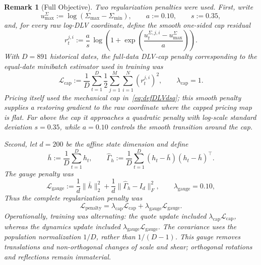 \documentclass[11pt,a4paper]{article}
\newtheorem{remark}[definition]{Remark}
\begin{document}
\begin{remark}[Full Objective]
  Two regularization penalties were used.  First, write
  \begin{equation}
    u_{\max}^{\Sigma}:=\log(\Sigma_{\max}-\Sigma_{\min}),
    \qquad a:=0.10,
    \qquad s:=0.35,
  \end{equation}
  and, for every raw log-DLV coordinate, define the smooth one-sided cap
  residual
  \begin{equation}
    r_t^{j,i}
    :=\frac{a}{s}\,
      \log\!\left(
        1+\exp\!\left(\frac{u_t^{\Sigma,j,i}-u_{\max}^{\Sigma}}{a}\right)
      \right).
  \end{equation}
  With $D=891$ historical dates, the full-data DLV-cap penalty corresponding
  to the equal-date minibatch estimator used in training was
  \begin{equation}
    \mathcal L_{\mathrm{cap}}
    :=\frac{1}{D}\sum_{t=1}^{D}
      \frac12\sum_{j=1}^{M}\sum_{i=1}^{N}(r_t^{j,i})^2,
    \qquad
    \lambda_{\mathrm{cap}}=1.
  \end{equation}
  Pricing itself used the mechanical cap in~\eqref{eq:defDLVdsq}; this smooth
  penalty supplies a restoring gradient to the raw coordinate where the
  capped pricing map is flat.  Far above the cap it approaches a quadratic
  penalty with log-scale standard deviation $s=0.35$, while $a=0.10$ controls
  the smooth transition around the cap.

  Second, let $d=200$ be the affine state dimension and define
  \begin{equation}
    \bar h:=\frac{1}{D}\sum_{t=1}^{D}h_t,
    \qquad
    \widehat\Gamma_h
    :=\frac{1}{D}\sum_{t=1}^{D}
      (h_t-\bar h)(h_t-\bar h)^\top.
  \end{equation}
  The gauge penalty was
  \begin{equation}
    \mathcal L_{\mathrm{gauge}}
    :=\frac{1}{d}\lVert\bar h\rVert_2^2
      +\frac{1}{d}\lVert\widehat\Gamma_h-I_d\rVert_F^2,
    \qquad
    \lambda_{\mathrm{gauge}}=0.10,
  \end{equation}
  Thus the complete regularization penalty was
  \begin{equation}
    \mathcal L_{\mathrm{penalty}}
    =\lambda_{\mathrm{cap}}\mathcal L_{\mathrm{cap}}
     +\lambda_{\mathrm{gauge}}\mathcal L_{\mathrm{gauge}}.
  \end{equation}
  Operationally, training was alternating: the quote update included
  $\lambda_{\mathrm{cap}}\mathcal L_{\mathrm{cap}}$, whereas the dynamics
  update included
  $\lambda_{\mathrm{gauge}}\mathcal L_{\mathrm{gauge}}$.
  The covariance uses the population normalization $1/D$, rather than
  $1/(D-1)$.  This gauge removes translations and non-orthogonal changes of
  scale and shear; orthogonal rotations and reflections remain immaterial.
\end{remark}
\end{document}
